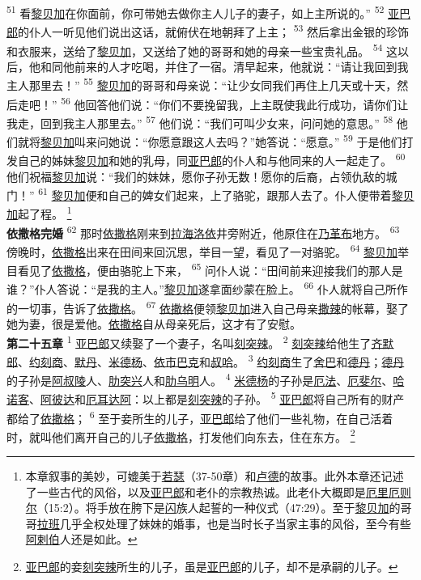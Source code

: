 \textsuperscript{51}
看\uline{黎贝加}在你面前，你可带她去做你主人儿子的妻子，如上主所说的。”
\textsuperscript{52}
\uline{亚巴郎}的仆人一听见他们说出这话，就俯伏在地朝拜了上主；
\textsuperscript{53}
然后拿出金银的珍饰和衣服来，送给了\uline{黎贝加}，又送给了她的哥哥和她的母亲一些宝贵礼品。
\textsuperscript{54}
这以后，他和同他前来的人才吃喝，并住了一宿。清早起来，他就说：“请让我回到我主人那里去！”
\textsuperscript{55}
\uline{黎贝加}的哥哥和母亲说：“让少女同我们再住上几天或十天，然后走吧！”
\textsuperscript{56}
他回答他们说：“你们不要挽留我，上主既使我此行成功，请你们让我走，回到我主人那里去。”
\textsuperscript{57}
他们说：“我们可叫少女来，问问她的意思。”
\textsuperscript{58}
他们就将\uline{黎贝加}叫来问她说：“你愿意跟这人去吗？”她答说：“愿意。”
\textsuperscript{59}
于是他们打发自己的姊妹\uline{黎贝加}和她的乳母，同\uline{亚巴郎}的仆人和与他同来的人一起走了。
\textsuperscript{60}
他们祝福\uline{黎贝加}说：“我们的妹妹，愿你子孙无数！愿你的后裔，占领仇敌的城门！”
\textsuperscript{61}
\uline{黎贝加}便和自己的婢女们起来，上了骆驼，跟那人去了。仆人便带着\uline{黎贝加}起了程。
\footnote{本章叙事的美妙，可媲美于\uline{若瑟}（37-50章）和\uline{卢德}的故事。此外本章还记述了一些古代的风俗，以及\uline{亚巴郎}和老仆的宗教热诚。此老仆大概即是\uline{厄里}\uline{厄则尔}（15:2）。将手放在胯下是\uline{闪}族人起誓的一种仪式（47:29）。至于\uline{黎贝加}的哥哥\uline{拉班}几乎全权处理了妹妹的婚事，也是当时长子当家主事的风俗，至今有些\uline{阿剌伯}人还是如此。}
\\
\indent
\textbf{依撒格完婚\quad}
\textsuperscript{62}
那时\uline{依撒格}刚来到\uline{拉海}\uline{洛依}井旁附近，他原住在\uline{乃革布}地方。
\textsuperscript{63}
傍晚时，\uline{依撒格}出来在田间来回沉思，举目一望，看见了一对骆驼。
\textsuperscript{64}
\uline{黎贝加}举目看见了\uline{依撒格}，便由骆驼上下来，
\textsuperscript{65}
问仆人说：“田间前来迎接我们的那人是谁？”仆人答说：“是我的主人。”\uline{黎贝加}遂拿面纱蒙在脸上。
\textsuperscript{66}
仆人就将自己所作的一切事，告诉了\uline{依撒格}。
\textsuperscript{67}
\uline{依撒格}便领\uline{黎贝加}进入自己母亲\uline{撒辣}的帐幕，娶了她为妻，很是爱他。\uline{依撒格}自从母亲死后，这才有了安慰。
\\
\indent
\textbf{第二十五章\quad}
\textsuperscript{1}
\uline{亚巴郎}又续娶了一个妻子，名叫\uline{刻突辣}。
\textsuperscript{2}
\uline{刻突辣}给他生了\uline{齐默郎}、\uline{约刻商}、\uline{默丹}、\uline{米德杨}、\uline{依市}\uline{巴克}和\uline{叔哈}。
\textsuperscript{3}
\uline{约刻商}生了\uline{舍巴}和\uline{德丹}；\uline{德丹}的子孙是\uline{阿叔陵}人、\uline{肋突兴}人和\uline{肋乌明}人。
\textsuperscript{4}
\uline{米德杨}的子孙是\uline{厄法}、\uline{厄斐尔}、\uline{哈诺客}、\uline{阿彼达}和\uline{厄耳达阿}：以上都是\uline{刻突辣}的子孙。
\textsuperscript{5}
\uline{亚巴郎}将自己所有的财产都给了\uline{依撒格}；
\textsuperscript{6}
至于妾所生的儿子，\uline{亚巴郎}给了他们一些礼物，在自己活着时，就叫他们离开自己的儿子\uline{依撒格}，打发他们向东去，住在东方。
\footnote{\uline{亚巴郎}的妾\uline{刻突辣}所生的儿子，虽是\uline{亚巴郎}的儿子，却不是承嗣的儿子。}


